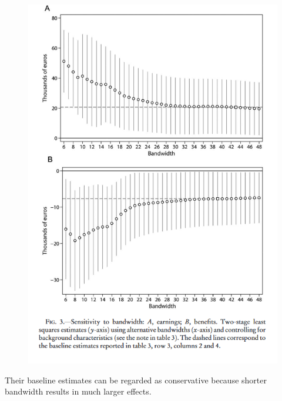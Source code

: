 \documentclass[../root]{subfiles}
\begin{document}
    \begin{figure}[h]
        \includegraphics[width=12cm]{0703sugiyama/Figure3.png}
    \end{figure}
    
    Their baseline estimates can be regarded as conservative because shorter bandwidth results in much larger effects. \\
    
\end{document}
